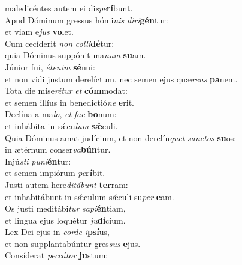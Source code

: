 \oddverse maledicéntes autem ei di\textit{spe}\textbf{rí}bunt.\\
\evenverse Apud Dóminum gressus hómi\textit{nis} \textit{di}\textit{ri}\textbf{gén}tur:~\*\\
\evenverse et viam e\textit{jus} \textbf{vo}let.\\
\oddverse Cum cecíderit \textit{non} \textit{col}\textit{li}\textbf{dé}tur:~\*\\
\oddverse quia Dóminus suppónit ma\textit{num} \textbf{su}am.\\
\evenverse Júnior fui, \textit{é}\textit{te}\textit{nim} \textbf{sé}nui:~\*\\
\evenverse et non vidi justum derelíctum, nec semen ejus quæ\textit{rens} \textbf{pa}nem.\\
\oddverse Tota die mise\textit{ré}\textit{tur} \textit{et} \textbf{cóm}modat:~\*\\
\oddverse et semen illíus in benedictió\textit{ne} \textbf{e}rit.\\
\evenverse Declína a ma\textit{lo}, \textit{et} \textit{fac} \textbf{bo}num:~\*\\
\evenverse et inhábita in sǽcu\textit{lum} \textbf{sǽ}culi.\\
\oddverse Quia Dóminus amat judícium, et non derelín\textit{quet} \textit{san}\textit{ctos} \textbf{su}os:~\*\\
\oddverse in ætérnum conser\textit{va}\textbf{bún}tur.\\
\evenverse Injú\textit{sti} \textit{pu}\textit{ni}\textbf{én}tur:~\*\\
\evenverse et semen impiórum \textit{pe}\textbf{rí}bit.\\
\oddverse Justi autem here\textit{di}\textit{tá}\textit{bunt} \textbf{ter}ram:~\*\\
\oddverse et inhabitábunt in sǽculum sǽculi su\textit{per} \textbf{e}am.\\
\evenverse Os justi meditábi\textit{tur} \textit{sa}\textit{pi}\textbf{én}tiam,~\*\\
\evenverse et lingua ejus loquétur \textit{ju}\textbf{dí}cium.\\
\oddverse Lex Dei ejus in \textit{cor}\textit{de} \textit{i}\textbf{psí}us,~\*\\
\oddverse et non supplantabúntur gres\textit{sus} \textbf{e}jus.\\
\evenverse Consíderat \textit{pec}\textit{cá}\textit{tor} \textbf{ju}stum:~\*\\
